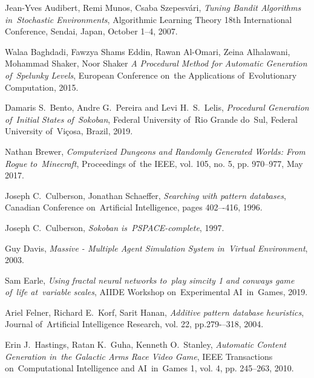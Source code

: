 \documentclass[a4paper,11pt,twoside]{report}
\theoremstyle{definition}
\begin{document}
\begin{thebibliography}{32}%

 Jean-Yves Audibert, Remi Munos, Csaba Szepesvári, \emph{Tuning Bandit Algorithms in~Stochastic Environments}, Algorithmic Learning Theory 18th International Conference, Sendai, Japan, October 1--4, 2007.

 Walaa Baghdadi, Fawzya Shams Eddin, Rawan Al-Omari, Zeina Alhalawani, Mohammad Shaker, Noor Shaker \emph{A Procedural Method for Automatic Generation of~Spelunky Levels}, European Conference on~the Applications of~Evolutionary Computation, 2015.
	
 Damaris S.~Bento, Andre G.~Pereira and Levi H.~S.~Lelis, \emph{Procedural Generation of~Initial States of~Sokoban}, Federal University of~Rio Grande do~Sul, Federal University of~Viçosa, Brazil, 2019.

 Nathan Brewer, \emph{Computerized Dungeons and Randomly Generated Worlds: From Rogue to~Minecraft}, Proceedings of~the IEEE, vol. 105, no. 5, pp. 970--977, May 2017.

 Joseph C.~Culberson, Jonathan Schaeffer, \emph{Searching with pattern databases}, Canadian Conference on~Artificial Intelligence, pages 402–-416, 1996.

 Joseph C.~Culberson, \emph{Sokoban is~PSPACE-complete}, 1997.

 Guy Davis, \emph{Massive - Multiple Agent Simulation System in~Virtual Environment}, 2003.
	
 Sam Earle, \emph{Using fractal neural networks to~play simcity 1 and conways game of~life at~variable scales}, AIIDE Workshop on~Experimental AI~in~Games, 2019.
	
 Ariel Felner, Richard E.~Korf, Sarit Hanan, \emph{Additive pattern database heuristics}, Journal of~Artificial Intelligence Research, vol. 22, pp.279-–318, 2004.

 Erin J.~Hastings, Ratan K.~Guha, Kenneth O.~Stanley, \emph{Automatic Content Generation in~the Galactic Arms Race Video Game}, IEEE Transactions on~Computational Intelligence and AI~in~Games 1, vol. 4, pp. 245--263, 2010.


\end{thebibliography}
\end{document}

